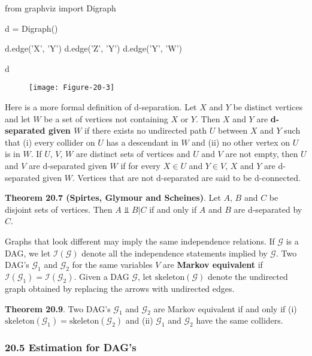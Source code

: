 \begin{python}
from graphviz import Digraph

d = Digraph()

d.edge('X', 'Y')
d.edge('Z', 'Y')
d.edge('Y', 'W')

d
\end{python}

\begin{figure}[H]
\texttt{[image: Figure-20-3]}
\end{figure}


Here is a more formal definition of d-separation. Let \(X\) and \(Y\) be
distinct vertices and let \(W\) be a set of vertices not containing
\(X\) or \(Y\). Then \(X\) and \(Y\) are \textbf{d-separated given
\(W\)} if there exists no undirected path \(U\) between \(X\) and \(Y\)
such that (i) every collider on \(U\) has a descendant in \(W\) and (ii)
no other vertex on \(U\) is in \(W\). If \(U\), \(V\), \(W\) are
distinct sets of vertices and \(U\) and \(V\) are not empty, then \(U\)
and \(V\) are d-separated given \(W\) if for every \(X \in U\) and
\(Y \in V\), \(X\) and \(Y\) are d-separated given \(W\). Vertices that
are not d-separated are said to be d-connected.

\textbf{Theorem 20.7 (Spirtes, Glymour and Scheines)}. Let \(A\), \(B\)
and \(C\) be disjoint sets of vertices. Then \(A \text{ ⫫ } B | C\) if
and only if \(A\) and \(B\) are d-separated by \(C\).

Graphs that look different may imply the same independence relations. If
\(\mathcal{G}\) is a DAG, we let \(\mathcal{I}(\mathcal{G})\) denote all
the independence statements implied by \(\mathcal{G}\). Two DAG's
\(\mathcal{G}_1\) and \(\mathcal{G}_2\) for the same variables \(V\) are
\textbf{Markov equivalent} if
\(\mathcal{I}(\mathcal{G}_1) = \mathcal{I}(\mathcal{G}_2)\). Given a DAG
\(\mathcal{G}\), let \(\text{skeleton}(\mathcal{G})\) denote the
undirected graph obtained by replacing the arrows with undirected edges.

\textbf{Theorem 20.9}. Two DAG's \(\mathcal{G}_1\) and \(\mathcal{G}_2\)
are Markov equivalent if and only if (i)
\(\text{skeleton}(\mathcal{G}_1) = \text{skeleton}(\mathcal{G}_2)\) and
(ii) \(\mathcal{G}_1\) and \(\mathcal{G}_2\) have the same colliders.

\subsubsection{20.5 Estimation for DAG's}\label{estimation-for-dags}

